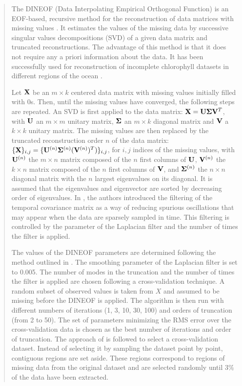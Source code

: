 \begin{quotation} The DINEOF (Data Interpolating Empirical Orthogonal Function)
is an EOF-based, recursive method for the reconstruction of data matrices with
missing values \cite{Beckers2003, Alvera-Azcarate2009}. It estimates the values
of the missing data by successive singular values decompositions (SVD) of a
given data matrix and truncated reconstructions. The advantage of this method
is that it does not require any a priori information about the data. It has
been successfully used for reconstruction of incomplete chlorophyll datasets in
different regions of the ocean \cite{Miles2010,Sirjacobs2011,Waite2013}.

Let $\mathbf{X}$ be an $m \times k$ centered data matrix with missing values initially
filled with 0s.  Then, until the missing values have converged, the following
steps are repeated. An SVD is first applied to the data matrix: $\mathbf{X} = \mathbf{U}\mathbf{\Sigma}
\mathbf{V}^T$, with $\mathbf{U}$ an $m\times m$ unitary matrix, $\mathbf{\Sigma}$ an $m\times k$
diagonal matrix and $\mathbf{V}$ a $k\times k$ unitary matrix. The missing values are
then replaced by the truncated reconstruction order $n$ of the data matrix:
$\{\mathbf{X}\}_{i,j} = \{\mathbf{U}^{(n)}\mathbf{\Sigma}^{(n)} (\mathbf{V}^{(n)})^T)\}_{i,j}$, for $i,j$
indices of the missing values, with $\mathbf{U}^{(n)}$ the $m\times n$ matrix composed
of the $n$ first columns of $\mathbf{U}$, $\mathbf{V}^{(n)}$ the $k\times n$ matrix composed of
the $n$ first columns of $\mathbf{V}$, and $\mathbf{\Sigma}^{(n)}$ the $n\times n$ diagonal
matrix with the $n$ largest eigenvalues on its diagonal. It is assumed that the
eigenvalues and eigenvector are sorted by decreasing order of eigenvalues. In
\cite{Alvera-Azcarate2009}, the authors introduced the filtering of the
temporal covariance matrix as a way of reducing spurious oscillations that may
appear when the data are sparsely sampled in time. This filtering is controlled
by the parameter of the Laplacian filter and the number of times the filter is
applied.

The values of the DINEOF parameters are determined following the method
outlined in \cite{Alvera-Azcarate2009}. The smoothing parameter of the
Laplacian filter is set to 0.005. The number of modes in the truncation and the
number of times the filter is applied are chosen following a cross-validation
technique. A random subset of observed values is taken from $X$ and assumed to
be missing before the DINEOF is applied. The algorithm is then run with
different numbers of iterations (1, 3, 10, 30, 100) and orders of truncation
(from 2 to 50). The set of parameters minimizing the RMS error over the
cross-validation data is chosen as the best number of iterations and order of
truncation. The approach of \cite{Beckers2006} is followed to select a
cross-validation dataset. Instead of selecting it by sampling the dataset point
by point, contiguous regions are set aside. These regions correspond to regions
of missing data from the original dataset and are selected randomly until 3\%
of the data have been extracted.

\end{quotation}

